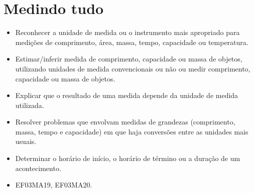 \chapter{Medindo tudo}

\enlargethispage{3\baselineskip}


\begin{itemize}
\item Reconhecer a unidade de medida ou o instrumento mais apropriado para
medições de comprimento, área, massa, tempo, capacidade ou temperatura.

\item Estimar/inferir medida de comprimento, capacidade ou massa de objetos,
utilizando unidades de medida convencionais ou não ou medir comprimento,
capacidade ou massa de objetos.

\item Explicar que o resultado de uma medida depende da unidade de medida
utilizada.

\item Resolver problemas que envolvam medidas de grandezas (comprimento,
massa, tempo e capacidade) em que haja conversões entre as unidades mais
usuais.

\item Determinar o horário de início, o horário de término ou a duração de
um acontecimento.
\end{itemize}


\begin{itemize}
\item EF03MA19, EF03MA20.
\end{itemize}


\pagebreak
{}

